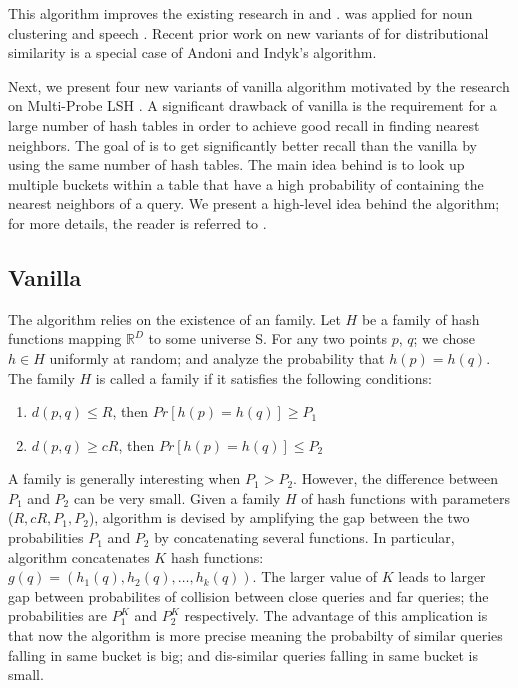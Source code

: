 This algorithm improves the existing research in \lsh and \plebf \cite{Indyk98STOC,Charikar02STOC}. 
\plebf was applied for noun clustering \cite{ravichandran05} and speech \cite {JansenASRU11,JansenIS12}. 
Recent prior work on new variants of \plebf  \cite{goyal12Flag} for distributional similarity is a special case of Andoni and Indyk's \lsh algorithm. 

Next, we present four new variants of vanilla \lsh algorithm motivated by the research on Multi-Probe LSH \cite{LvVLDB07}. 
A signiﬁcant drawback of vanilla \lsh is the requirement for a large number of hash tables in order to achieve good recall 
in finding nearest neighbors. 
The goal of  \mblshf is to get signiﬁcantly better recall than the vanilla \lsh by using 
the same number of hash tables. The main idea behind \mblshf is to look up multiple buckets within a table that have a high probability 
of containing the nearest neighbors of a query. We present a high-level idea behind the \mblshf algorithm; 
for more details, the reader is referred to \cite{LvVLDB07}.


\subsection{Vanilla \lsh}
\label{sec:vlsh}
The \lsh algorithm relies on the existence of an \lsh family. Let $H$ be a family of hash functions mapping 
 $\mathbb{R}^D$ to some universe S. For any two points $p$, $q$; we chose $h\in H$ uniformly at random; 
 and analyze the probability that $h(p) = h(q)$.  The family $H$ is called a \lsh family if 
 it satisfies the following conditions:

\begin{enumerate}
\item $d(p,q) \leq R$, then $Pr[h(p)=h(q)] \geq P_1$ 
\item $d(p,q) \geq cR$, then $Pr[h(p)=h(q)] \leq P_2$
\end{enumerate}

A family is generally interesting when  $P_1>P_2$. 
However, the difference between $P_1$ and $P_2$ can be very small. 
Given a family $H$ of hash functions with parameters ($R, cR, P_1,P_2$), 
\lsh algorithm is devised by amplifying the gap between 
the two probabilities $P_1$ and $P_2$ by concatenating several functions. 
In particular, \lsh algorithm concatenates $K$ hash functions: 
$g(q)=(h_1(q),h_2(q),\dots,h_k(q))$. The larger value of $K$ leads to larger 
gap between probabilites of collision between close queries and far queries; 
the probabilities are $P_1^{K}$ and $P_2^{K}$ respectively. 
The advantage of this amplication is that now the algorithm is more precise meaning 
the probabilty of similar queries falling in same bucket is big; 
and dis-similar queries falling in same bucket is small.  

